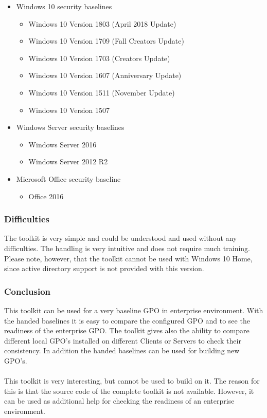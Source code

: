 \begin{itemize}
    \item Windows 10 security baselines
    \begin{itemize}
        \item Windows 10 Version 1803 (April 2018 Update)
        \item Windows 10 Version 1709 (Fall Creators Update)
        \item Windows 10 Version 1703 (Creators Update)
        \item Windows 10 Version 1607 (Anniversary Update)
        \item Windows 10 Version 1511 (November Update)
        \item Windows 10 Version 1507
    \end{itemize}
    \item Windows Server security baselines
    \begin{itemize}
        \item Windows Server 2016
        \item Windows Server 2012 R2
    \end{itemize}
    \item Microsoft Office security baseline
    \begin{itemize}
        \item Office 2016
    \end{itemize}
\end{itemize}

\subsubsection{Difficulties}
The toolkit is very simple and could be understood and used without any difficulties. The handling is very intuitive and does not require much training. Please note, however, that the toolkit cannot be used with Windows 10 Home, since active directory support is not provided with this version.

\subsubsection{Conclusion}
This toolkit can be used for a very baseline GPO in enterprise environment. With the handed baselines it is easy to compare the configured GPO and to see the readiness of the enterprise GPO. The toolkit gives also the ability to compare different local GPO's installed on different Clients or Servers to check their consistency. In addition the handed baselines can be used for building new GPO's.
\\\\
This toolkit is very interesting, but cannot be used to build on it. The reason for this is that the source code of the complete toolkit is not available. However, it can be used as additional help for checking the readiness of an enterprise environment.

